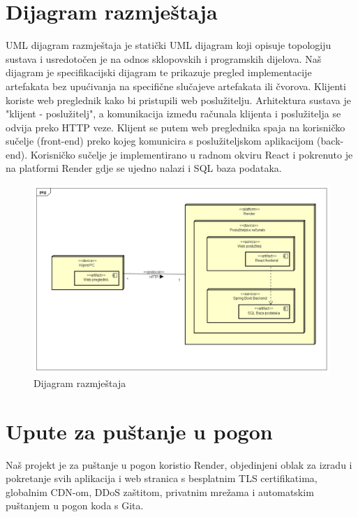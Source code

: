    

        \newpage
		
		\section{Dijagram razmještaja}
            UML dijagram razmještaja je statički UML dijagram koji opisuje topologiju sustava i usredotočen je na odnos sklopovskih i programskih dijelova. Naš dijagram je specifikacijski dijagram te prikazuje pregled implementacije artefakata bez upućivanja na specifične slučajeve artefakata ili čvorova. Klijenti koriste web preglednik kako bi pristupili web poslužitelju. Arhitektura sustava je "klijent - poslužitelj", a komunikacija između računala klijenta i poslužitelja se odvija preko HTTP veze. Klijent se putem web preglednika spaja na korisničko sučelje (front-end) preko kojeg komunicira s poslužiteljskom aplikacijom (back-end). Korisničko sučelje je implementirano u radnom okviru React i pokrenuto je na platformi Render gdje se ujedno nalazi i SQL baza podataka.
            
            \begin{figure}[H]
                \includegraphics[width=\textwidth]{slike/Dijagram razmjestaja.png} 
                    \caption{Dijagram razmještaja}
                \label{fig:Dijagram razmještaja}
            \end{figure}
  
        \newpage
			
		
		\section{Upute za puštanje u pogon}

        \text Naš projekt je za puštanje u pogon koristio Render, objedinjeni oblak za izradu i pokretanje svih aplikacija i web stranica s besplatnim TLS certifikatima, globalnim CDN-om, DDoS zaštitom, privatnim mrežama i automatskim puštanjem u pogon koda s Gita.


